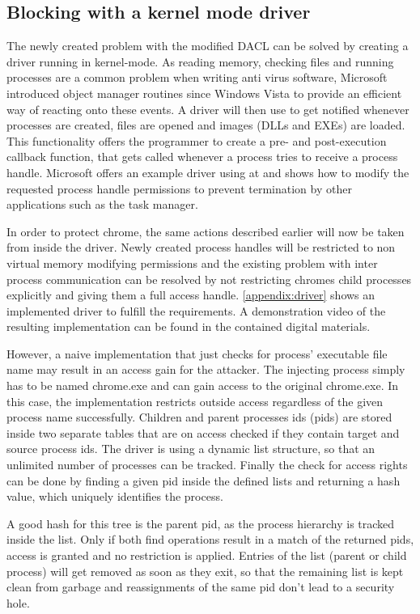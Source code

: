 \subsection{Blocking  with a kernel mode driver}
The newly created problem with the modified DACL can be solved by creating a driver running in kernel-mode. As reading memory, checking files and running processes are a common problem when writing anti virus software, Microsoft introduced object manager routines since Windows Vista to provide an efficient way of reacting onto these events. A driver will then use  to get notified whenever processes are created, files are opened and images (DLLs and EXEs) are loaded. This functionality offers the programmer to create a pre- and post-execution callback function, that gets called whenever a process tries to receive a process handle. Microsoft offers an example driver using  at \cite{github_obcallback} and shows how to modify the requested process handle permissions to prevent termination by other applications such as the task manager. 

In order to protect chrome, the same actions described earlier will now be taken from inside the driver. Newly created process handles will be restricted to non virtual memory modifying permissions and the existing problem with inter process communication can be resolved by not restricting chromes child processes explicitly and giving them a full access handle. \ref{appendix:driver} shows an implemented driver to fulfill the requirements. A demonstration video of the resulting implementation can be found in the contained digital materials.

However, a naive implementation that just checks for process' executable file name may result in an access gain for the attacker. The injecting process simply has to be named chrome.exe and can gain access to the original chrome.exe. In this case, the implementation restricts outside access regardless of the given process name successfully. Children and parent processes ids (pids) are stored inside two separate tables that are on access checked if they contain target and source process ids. The driver is using a dynamic list structure, so that an unlimited number of processes can be tracked. Finally the check for access rights can be done by finding a given pid inside the defined lists and returning a hash value, which uniquely identifies the process. 

A good hash for this tree is the parent pid, as the process hierarchy is tracked inside the list. Only if both find operations result in a match of the returned pids, access is granted and no restriction is applied. Entries of the list (parent or child process) will get removed as soon as they exit, so that the remaining list is kept clean from garbage and reassignments of the same pid don't lead to a security hole. 

